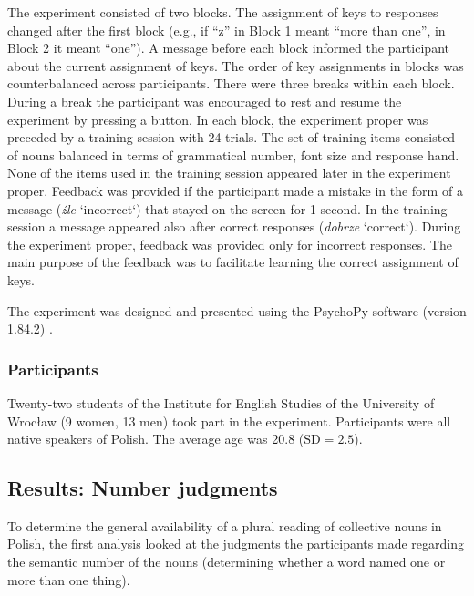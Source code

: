 \documentclass[output=paper]{langscibook}
\begin{document}
The experiment consisted of two blocks. The assignment of keys to responses changed after the first block (e.g., if “z” in Block 1 meant “more than one”, in Block 2 it meant “one”). A message before each block informed the participant about the current assignment of keys. The order of key assignments in blocks was counterbalanced across participants. There were three breaks within each block. During a break the participant was encouraged to rest and resume the experiment by pressing a button. In each block, the experiment proper was preceded by a training session with 24 trials. The set of training items consisted of nouns balanced in terms of grammatical number, font size and response hand. None of the items used in the training session appeared later in the experiment proper. Feedback was provided if the participant made a mistake in the form of a message (\textit{źle} ‘incorrect‘) that stayed on the screen for 1 second. In the training session a message appeared also after correct responses (\textit{dobrze} ‘correct‘). During the experiment proper, feedback was provided only for incorrect responses. The main purpose of the feedback was to facilitate learning the correct assignment of keys. 

The experiment was designed and presented using the PsychoPy software (version 1.84.2) \citep{peircePsychoPyPsychophysicsSoftware2007, peirceGeneratingStimuliNeuroscience2009}.

\subsubsection{Participants}
Twenty-two students of the Institute for English Studies of the University of Wrocław (9 women, 13 men) took part in the experiment. Participants were all native speakers of Polish. The average age was 20.8 ($\text{SD}=2.5$).

\subsection{Results: Number judgments}
To determine the general availability of a plural reading of collective nouns in Polish, the first analysis looked at the judgments the participants made regarding the semantic number of the nouns (determining whether a word named one or more than one thing).
\end{document}
